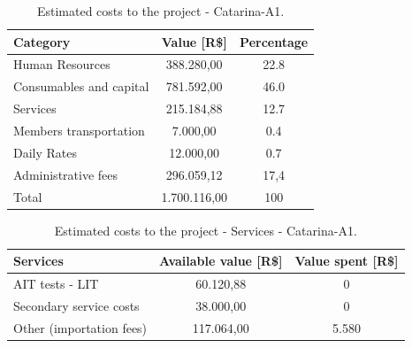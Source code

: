 \begin{table}[H]
    \centering
    \begin{tabular}{lcc}
        \toprule[1.5pt]
        \textbf{Category} & \textbf{Value [R\$]} & \textbf{Percentage} \\
        \midrule
        Human Resources         & 388.280,00   & 22.8 \\
        Consumables and capital & 781.592,00   & 46.0 \\
        Services                & 215.184,88   & 12.7 \\
        Members transportation  & 7.000,00     & 0.4 \\
        Daily Rates             & 12.000,00    & 0.7 \\
        Administrative fees     & 296.059,12   & 17,4 \\
        Total                   & 1.700.116,00 & 100 \\
        \bottomrule[1.5pt]
    \end{tabular}
    \caption{Estimated costs to the project - Catarina-A1.}
    \label{tabela_cost1}
\end{table}

\begin{table}[H]
    \centering
    \begin{tabular}{lcc}
        \toprule[1.5pt]
        \textbf{Services} & \textbf{Available value [R\$]} & \textbf{ Value spent [R\$]} \\
        \midrule
        \ac{AIT} tests - LIT                                 & 60.120,88 & 0 \\
        Secondary service costs                                    & 38.000,00 & 0 \\
        Other (importation fees)                                     & 117.064,00 & 5.580 \\
        \bottomrule[1.5pt]
    \end{tabular}
    \caption{Estimated costs to the project - Services - Catarina-A1.}
    \label{tabela_cost2}
\end{table}

